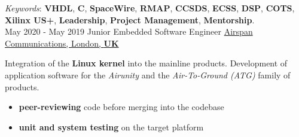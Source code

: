 \documentclass[letterpaper]{twentysecondcv} %
\begin{document}
\begin{twenty}
{            \vspace{1 mm}
            \textit{Keywords}: \textbf{VHDL}, \textbf{C}, \textbf{SpaceWire}, \textbf{RMAP}, \textbf{CCSDS}, \textbf{ECSS}, \textbf{DSP}, \textbf{COTS}, \textbf{Xilinx US+}, \textbf{Leadership}, \textbf{Project Management}, \textbf{Mentorship}.
        }\\
    \twentyitem
    	{May 2020 -}
		{May 2019}
        {Junior Embedded Software Engineer}
        {\href{https://www.airspan.com/}{Airspan Communications, London, \textbf{UK}}}
        {}
        {
            Integration of the \textbf{Linux kernel} into the mainline products. Development of application software for the \textit{Airunity} and the \textit{Air-To-Ground (ATG)} family of products.
            \vspace{1 mm}
            \begin{itemize}
                \item \textbf{peer-reviewing} code before merging into the codebase
                \item \textbf{unit and system testing} on the target platform

\end{itemize}}
\end{twenty}
\end{document}
